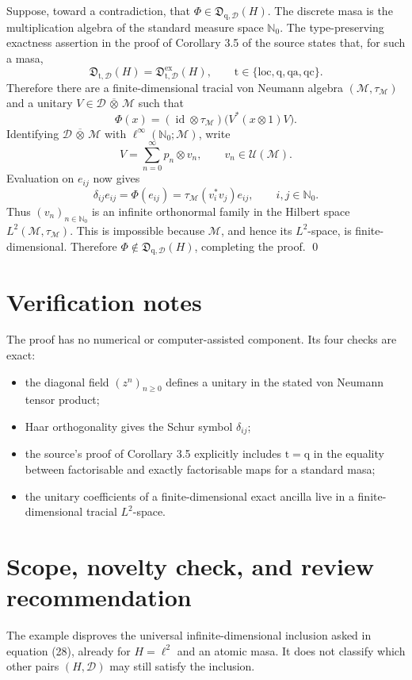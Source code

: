 \documentclass[11pt]{article}
\newcommand{\D}{\mathcal D}
\newcommand{\M}{\mathcal M}
\newcommand{\N}{\mathbb N_0}
\newcommand{\id}{\operatorname{id}}
\begin{document}
Suppose, toward a contradiction, that
$\Phi\in\mathfrak D_{\mathrm q,\D}(H)$.  The discrete masa is the multiplication
algebra of the standard measure space $\N$.  The type-preserving exactness
assertion in the proof of Corollary 3.5 of the source states that, for such a
masa,
\[
 \mathfrak D_{\mathrm t,\D}(H)=
 \mathfrak D^{\mathrm{ex}}_{\mathrm t,\D}(H),
 \qquad \mathrm t\in\{\mathrm{loc},\mathrm q,\mathrm{qa},\mathrm{qc}\}.
\]
Therefore there are a finite-dimensional tracial von Neumann algebra
$(\M,\tau_{\M})$ and a unitary
$V\in\D\,\overline\otimes\,\M$ such that
\[
  \Phi(x)=(\id\otimes\tau_{\M})
  \bigl(V^*(x\otimes1)V\bigr).
\]
Identifying $\D\,\overline\otimes\,\M$ with
$\ell^\infty(\N;\M)$, write
\[
  V=\sum_{n=0}^\infty p_n\otimes v_n,
  \qquad v_n\in\mathcal U(\M).
\]
Evaluation on $e_{ij}$ now gives
\[
  \delta_{ij}e_{ij}=\Phi(e_{ij})
  =\tau_{\M}(v_i^*v_j)e_{ij},
  \qquad i,j\in\N.
\]
Thus $(v_n)_{n\in\N}$ is an infinite orthonormal family in the Hilbert space
$L^2(\M,\tau_{\M})$.  This is impossible because $\M$, and hence its
$L^2$-space, is finite-dimensional.  Therefore
$\Phi\notin\mathfrak D_{\mathrm q,\D}(H)$, completing the proof. \qed

\section*{Verification notes}

The proof has no numerical or computer-assisted component.  Its four checks
are exact:
\begin{itemize}
\item the diagonal field $(z^n)_{n\geq0}$ defines a unitary in the stated
  von Neumann tensor product;
\item Haar orthogonality gives the Schur symbol $\delta_{ij}$;
\item the source's proof of Corollary 3.5 explicitly includes
  $\mathrm t=\mathrm q$ in the equality between factorisable and exactly
  factorisable maps for a standard masa;
\item the unitary coefficients of a finite-dimensional exact ancilla live in
  a finite-dimensional tracial $L^2$-space.
\end{itemize}

\section*{Scope, novelty check, and review recommendation}

The example disproves the universal infinite-dimensional inclusion asked in
equation (28), already for $H=\ell^2$ and an atomic masa.  It does not classify
which other pairs $(H,\D)$ may still satisfy the inclusion.
\end{document}
